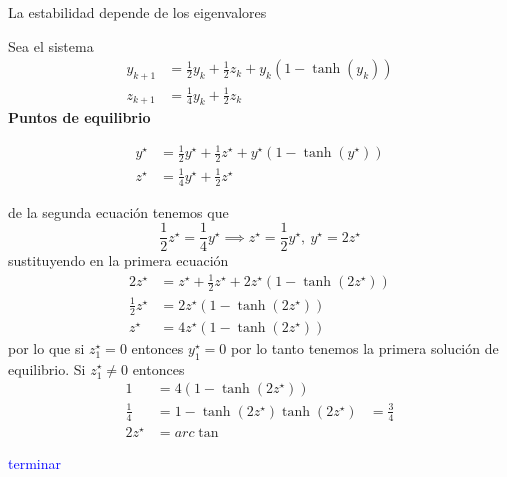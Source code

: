 La estabilidad depende de los eigenvalores

\begin{ejemplo}
	Sea el sistema
	\begin{align*}
	  y_{k+1} &= \frac{1}{2}y_k + \frac{1}{2}z_k+y_k(1-\tanh (y_k)) \\
		z_{k+1}&=\frac{1}{4}y_k + \frac{1}{2}z_k
	\end{align*}
	\textbf{Puntos de equilibrio}	

	\begin{align*}
	  y^{\star} &= \frac{1}{2}y^{\star}+\frac{1}{2}z^{\star}+y^{\star}(1-\tanh(y^{\star}))\\
		z^{\star}&=\frac{1}{4}y^{\star}+\frac{1}{2}z^{\star}
	\end{align*}

	de la segunda ecuación tenemos que
	\begin{equation*}
	  \frac{1}{2}z^{\star}=\frac{1}{4}y^{\star} \implies z^{\star}=\frac{1}{2}y^{\star},\ y^{\star}=2z^{\star} 
	\end{equation*}
	sustituyendo en la primera ecuación
	\begin{align*}
	  2z^{\star} &= z^{\star}+\frac{1}{2}z^{\star}+2z^{\star}(1-\tanh(2z^{\star})) \\
		\frac{1}{2}z^{\star}&= 2z^{\star}\left( 1-\tanh(2z^{\star}) \right) \\
		z^{\star}&=4z^{\star}\left( 1- \tanh(2z^{\star}) \right) 
	\end{align*}
	por lo que si $z_1^{\star}=0$ entonces $y_1^{\star}=0$ por lo tanto tenemos la primera solución de equilibrio. Si $z_1^{\star}\neq 0$ entonces
	\begin{align*}
	  1 &= 4\left( 1-\tanh (2z^{\star}) \right) \\
		\frac{1}{4} &= 1-\tanh (2z^{\star})
		\tanh (2z^{\star}) &= \frac{3}{4} \\
		2z^{\star}&= arc\tan
	\end{align*}

	\textcolor{blue}{terminar}	


\end{ejemplo}
